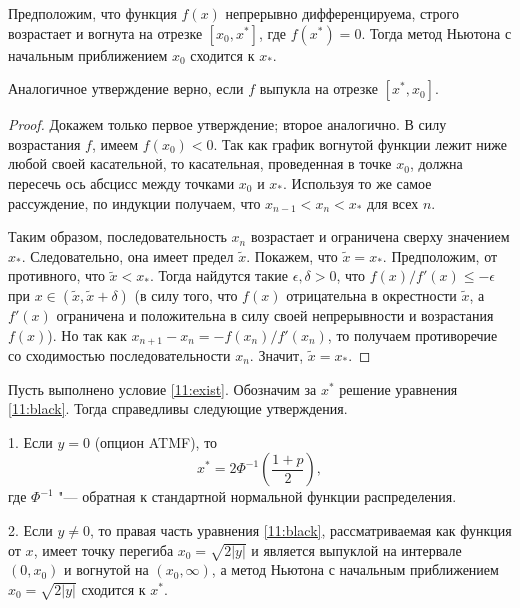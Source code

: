\begin{proposition}
\label{iv:p:newton}
Предположим, что функция $f(x)$ непрерывно дифференцируема, строго возрастает и вогнута на  отрезке $[x_0,x^*]$, где $f(x^*)=0$. 
Тогда метод Ньютона с начальным приближением $x_0$ сходится к $x_*$.

Аналогичное утверждение верно, если $f$ выпукла на отрезке $[x^*,x_0]$.
\end{proposition}

\begin{proof}
Докажем только первое утверждение; второе аналогично.
В силу возрастания $f$, имеем $f(x_0) < 0$.
Так как график вогнутой функции лежит ниже любой своей касательной, то касательная, проведенная в точке $x_0$, должна пересечь ось абсцисс между точками $x_0$ и $x_*$.
Используя то же самое рассуждение, по индукции получаем, что $x_{n-1} < x_n < x_*$ для всех $n$.

Таким образом, последовательность $x_n$ возрастает и ограничена сверху значением $x_*$.
Следовательно, она имеет предел $\tilde x$.
Покажем, что $\tilde x=x_*$.
Предположим, от противного, что $\tilde x < x_*$.
Тогда найдутся такие $\epsilon,\delta>0$, что $f(x)/f'(x) \le -\epsilon$ при $x \in (\tilde x, \tilde x+\delta)$ (в силу того, что $f(x)$ отрицательна в окрестности $\tilde x$, а $f'(x)$ ограничена и положительна в силу своей непрерывности и возрастания $f(x)$).
Но так как $x_{n+1} - x_n = -f(x_n)/f'(x_n)$, то получаем противоречие со сходимостью последовательности $x_n$. Значит, $\tilde x = x_*$.  
\end{proof}

\begin{proposition}
Пусть выполнено условие \eqref{11:exist}.
Обозначим за $x^*$ решение уравнения \eqref{11:black}.
Тогда справедливы следующие утверждения.

1. Если $y=0$ (опцион ATMF), то 
\begin{equation}
\label{11:atm}
x^* = 2 \Phi^{-1}\left(\frac{1+p}{2}\right),
\end{equation}
где $\Phi^{-1}$ "--- обратная к стандартной нормальной функции распределения.

2. Если $y\neq 0$, то правая часть уравнения \eqref{11:black}, рассматриваемая как функция от $x$, имеет точку перегиба $x_0 = \sqrt{2|y|}$ и является выпуклой на интервале $(0,x_0)$ и вогнутой на $(x_0,\infty)$, а метод Ньютона с начальным приближением $x_0 = \sqrt{2|y|}$ сходится к $x^*$.
\end{proposition}

